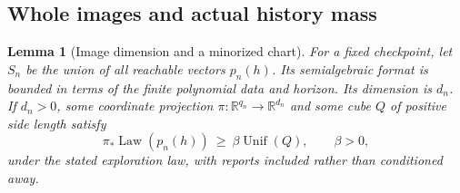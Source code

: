 \documentclass[11pt]{amsart}
\newtheorem{lemma}[theorem]{Lemma}
\theoremstyle{definition}\newtheorem{definition}[theorem]{Definition}
\theoremstyle{remark}\newtheorem{remark}[theorem]{Remark}
\newcommand{\R}{\mathbb R}\newcommand{\N}{\mathbb N}\newcommand{\C}{\mathbb C}
\begin{document}
\subsection{Whole images and actual history mass}
\begin{lemma}[Image dimension and a minorized chart]\label{lem:v18-image-mass}
For a fixed checkpoint, let $S_n$ be the union of all reachable vectors
$p_n(h)$. Its semialgebraic format is bounded in terms of the finite
polynomial data and horizon. Its dimension is $d_n$. If $d_n>0$, some
coordinate projection $\pi:\R^{q_n}\to\R^{d_n}$ and some cube $Q$
of positive side length satisfy
\begin{equation}\label{eq:v18-image-minorization}
 \pi_*\operatorname{Law}(p_n(h))\ \ge\ \beta\operatorname{Unif}(Q),
 \qquad \beta>0,
\end{equation}
under the stated exploration law, with reports included rather than
conditioned away.
\end{lemma}
\end{document}
